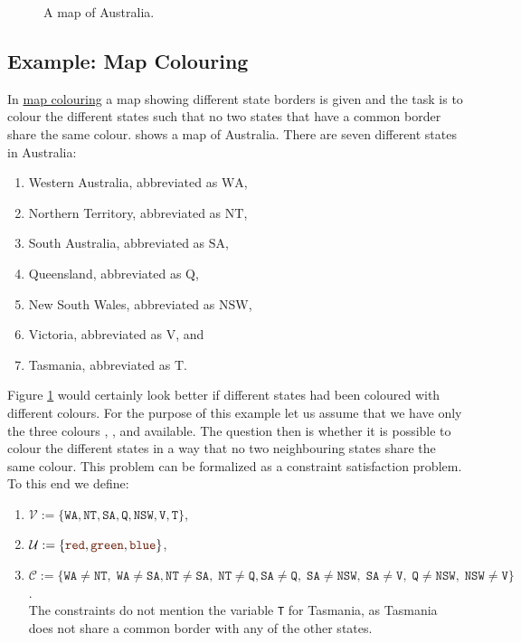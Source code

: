 \begin{figure}[!ht]
  \centering
  \caption{A map of Australia.}
  \label{fig:australia.pdf}
\end{figure}

\subsection{Example: Map Colouring}
In \href{https://en.wikipedia.org/wiki/Four_color_theorem}{map colouring}  a map showing
different state 
borders is given and the task is to colour the different states such that no two states that have a common
border share the same colour.   shows a map of Australia.  There are seven different
states in Australia:
\begin{enumerate}
\item Western Australia, abbreviated as $\mathrm{WA}$,
\item Northern Territory, abbreviated as $\mathrm{NT}$,
\item South Australia, abbreviated as $\mathrm{SA}$,
\item Queensland, abbreviated as $\mathrm{Q}$,
\item New South Wales, abbreviated as $\mathrm{NSW}$,
\item Victoria, abbreviated as $\mathrm{V}$, and
\item Tasmania, abbreviated as $\mathrm{T}$.
\end{enumerate}
Figure \ref{fig:australia.pdf} would certainly look better if different states had been coloured with different
colours.  For the purpose of 
this example let us assume that we have only the three colours , , and  
available.  The question then is whether it is  
possible to colour the different states in a way that no two neighbouring states share the same colour.  This
problem can be formalized as a constraint satisfaction problem.  To this end we define:
\begin{enumerate}
\item $\mathcal{V} := \{ \mathtt{WA}, \mathtt{NT}, \mathtt{SA}, \mathtt{Q}, \mathtt{NSW}, \mathtt{V}, \mathtt{T} \}$,
\item $\mathcal{U} := \{ \mytt{red}, \mytt{green}, \mytt{blue} \}$,
\item $\mathcal{C} :=  
      \bigl\{ \mathtt{WA} \not= \mathtt{NT},\;\mathtt{WA} \not= \mathtt{SA},
                 \mathtt{NT} \not= \mathtt{SA},\;\mathtt{NT} \not= \mathtt{Q},
                 \mathtt{SA} \not= \mathtt{Q},\; \mathtt{SA} \not= \mathtt{NSW},\;\mathtt{SA} \not= \mathtt{V},\;
                 \mathtt{Q}  \not= \mathtt{NSW},\;
                 \mathtt{NSW}\not= \mathtt{V}
       \bigr\}
       $.
       \\[0.1cm]
       The constraints do not mention the variable \texttt{T} for Tasmania, as Tasmania does not share a common
       border with any of the other states.
\end{enumerate}
